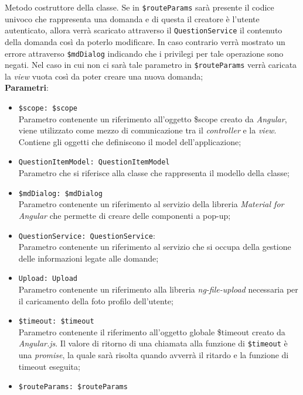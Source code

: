 \begin{itemize}
\begin{itemize}
		Metodo costruttore della classe. Se in \texttt{\$routeParams} sarà presente il codice univoco che rappresenta una domanda e di questa il creatore è l'utente autenticato, allora verrà scaricato attraverso il \texttt{QuestionService} il contenuto della domanda così da poterlo modificare. In caso contrario verrà mostrato un errore attraverso \texttt{\$mdDialog} indicando che i privilegi per tale operazione sono negati. Nel caso in cui non ci sarà tale parametro in \texttt{\$routeParams} verrà caricata la \textit{view} vuota così da poter creare una nuova domanda; \\
		\textbf{Parametri}:
		\begin{itemize}
			\item \texttt{\$scope: \$scope} \\
			Parametro contenente un riferimento all’oggetto \$scope creato da \textit{Angular}, viene utilizzato come mezzo di comunicazione tra il \textit{controller} e la \textit{view}. Contiene gli oggetti che definiscono il model dell’applicazione;
			\item \texttt{QuestionItemModel: QuestionItemModel} \\ 
			Parametro che si riferisce alla classe che rappresenta il modello della classe;
			\item \texttt{\$mdDialog: \$mdDialog} \\
			Parametro contenente un riferimento al servizio della libreria \textit{Material for Angular} che permette di creare delle componenti a pop-up;
			\item \texttt{QuestionService: QuestionService}: \\
			Parametro contenente un riferimento al servizio che si occupa della gestione delle informazioni legate alle domande;
			\item \texttt{Upload: Upload} \\
			Parametro contenente un riferimento alla libreria \textit{ng-file-upload} necessaria per il caricamento della foto profilo dell'utente;
			\item \texttt{\$timeout: \$timeout} \\
			Parametro contenente il riferimento all'oggetto globale \$timeout creato da \textit{Angular.js}. 
			Il valore di ritorno di una chiamata alla funzione di \texttt{\$timeout} è una \textit{promise}, la quale sarà risolta quando avverrà il ritardo e la funzione di timeout eseguita; 
			\item \texttt{\$routeParams: \$routeParams} \\

\end{itemize}
\end{itemize}
\end{itemize}
